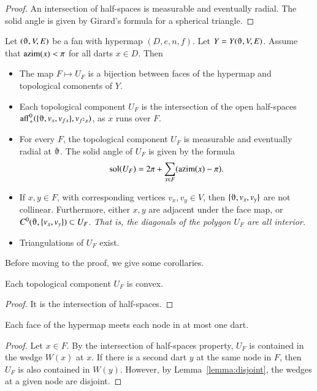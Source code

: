 \begin{proof} An intersection of half-spaces is measurable and
eventually radial.  The solid angle is given by Girard's formula for
a spherical triangle.
\end{proof}

\begin{lemma}\label{lemma:face}
Let $(\orgn,V,E)$ be a fan with hypermap $(D,e,n,f)$. 
Let $Y=Y(\orgn,V,E)$.
Assume that ${\operatorname{azim}}(x)<\pi$
for all darts $x\in D$.  Then
\begin{itemize}
\item The map $F\mapsto U_F$ is a bijection between faces of the hypermap
and topological comonents of $Y$.
\item  Each topological component $U_F$ is the intersection of the open
half-spaces $\op{aff}_+^0(\{\orgn,v_x,v_{f x}\},v_{f^2 x})$, as $x$ runs
over $F$.
\item For every $F$, the topological component $U_F$ is measurable and
eventually radial at $\orgn$.  The solid angle of $U_F$ is given by the
formula
$$
\operatorname{sol}(U_F) = 2\pi + \sum_{x\in F}({\operatorname{azim}}(x)-\pi).
$$
\item If $x,y\in F$, with corresponding vertices $v_x,v_y\in V$, then
$\{\orgn,v_x,v_y\}$ are not collinear.
Furthermore, 
either $x,y$ are adjacent under the face map, or $C^0(\orgn,\{v_x,v_y\})\subset U_F$.  {\it That is, the diagonals of the polygon $U_F$ are all interior.}
\item  Triangulations of $U_F$ exist.
\end{itemize}
\end{lemma}

Before moving to the proof, we give some corollaries.

\begin{corollary}
Each topological component $U_F$ is convex.
\end{corollary}

\begin{proof} It is the intersection of half-spaces.
\end{proof}

\begin{corollary}  Each face of the hypermap meets each node in at most
one dart.
\end{corollary}

\begin{proof}  Let $x\in F$.  By the intersection of half-spaces property,
$U_F$ is contained in the wedge $W(x)$ at $x$.  If there is a second
dart $y$ at the same node in $F$, then $U_F$ is also contained in $W(y)$.
However, by Lemma~\ref{lemma:disjoint}, the wedges at a given node are disjoint.
\end{proof}

